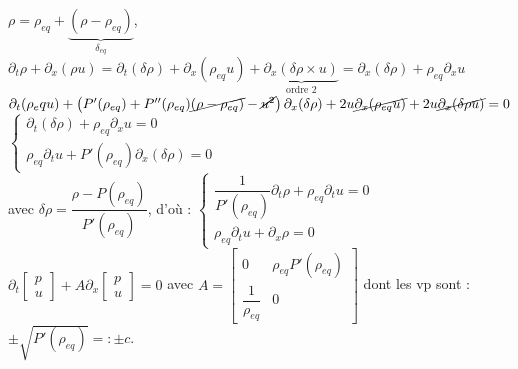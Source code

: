 \documentclass[12pt,a4paper]{article}
\begin{document}
\begin{sol}
\begin{enumerate}
\begin{minipage}[t]{17cm}
			$\rho = \rho_{eq} + \underbrace{(\rho-\rho_{eq})}_{\delta_{eq}}$, $\partial_t \rho + \partial_x (\rho u) = \partial_t(\delta \rho) + \partial_x(\rho_{eq} u) + \underbrace{\partial_x(\delta\rho\times u)}_{\text{ordre 2}} = \partial_x (\delta \rho) + \rho_{eq} \partial_x u$\\
			$\partial_t(\rho_eq u)+\left(P'(\rho_{eq})+P''(\rho_{eq})\cancel{(\rho-\rho_{eq})} - \cancel{u^2} \right)\partial_x(\delta \rho) + 2u\cancel{\partial_x(\rho_{eq} u )} + 2u\cancel{\partial_x(\delta \rho u)} = 0$\\
			
			$\begin{cases}
				\partial_t(\delta \rho)+\rho_{eq}\partial_x u = 0\\
				\rho_{eq}\partial_t u + P'(\rho_{eq})\partial_x( \delta \rho) = 0
			\end{cases}$\\
			avec $\delta\rho = \dfrac{\rho - P(\rho_{eq})}{P'(\rho_{eq})}$, d'où : $\begin{cases}
				\dfrac1{P'(\rho_{eq})}\partial_t\rho + \rho_{eq}\partial_t u = 0\\
				\rho_{eq} \partial_t u + \partial_x \rho = 0
			\end{cases}$\\
			$\partial_t \begin{bmatrix}
				p\\
				u
			\end{bmatrix} + A\partial_x \begin{bmatrix}
			p \\
			u
			\end{bmatrix} = 0$ avec $A= \begin{bmatrix}
			0 & \rho_{eq}P'(\rho_{eq}) \\
			\dfrac1{\rho_{eq}} & 0
			\end{bmatrix}$ dont les vp sont : $\pm \sqrt{P'(\rho_{eq})} =: \pm c$.
			
			\vspace{.5cm}
			

\end{minipage}
\end{enumerate}
\end{sol}
\end{document}

